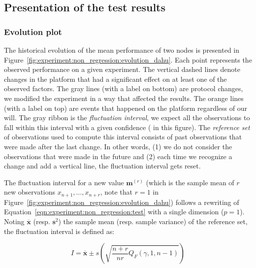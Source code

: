         \subsection{Presentation of the test results}%
        \label{sub:presentation_of_the_test_results}

            \subsubsection{Evolution plot}%

                The historical evolution of the mean performance of two nodes is presented in
                Figure~\ref{fig:experiment:non_regression:evolution_dahu}. Each point represents the observed
                performance on a given experiment. The vertical dashed lines denote changes in the platform that had a
                significant effect on at least one of the observed factors. The gray lines (with a label on bottom) are
                protocol changes, we modified the experiment in a way that affected the results. The orange lines (with
                a label on top) are events that happened on the platform regardless of our will.  The gray ribbon is the
                \emph{fluctuation interval}, we expect all the observations to fall within this interval with a given
                confidence ( in this figure). The \emph{reference set} of observations used to
                compute this interval consists of past observations that were made after the last change. In other
                words, (1) we do not consider the observations that were made in the future and (2) each time we
                recognize a change and add a vertical line, the fluctuation interval gets reset.

                The fluctuation interval for a new value \(\bm{m}^{(r)}\) (which is the sample mean of \(r\) new
                observations \(x_{n+1},\dots,x_{n+r}\), note that \(r=1\) in
                Figure~\ref{fig:experiment:non_regression:evolution_dahu}) follows a rewriting of
                Equation~\ref{eqn:experiment:non_regression:test} with a single dimension (\(p=1\)). Noting
                \(\overline{\bm{x}}\) (resp. \(\bm{s}^2\)) the sample mean (resp. sample variance) of the reference set,
                the fluctuation interval is defined as:

                \begin{equation}\label{eqn:experiment:non_regression:interval}
                    I = \overline{\bm{x}} \pm s \left(\sqrt{\frac{n+r}{nr}Q_F(\gamma, 1, n-1)}\right)
                \end{equation}

